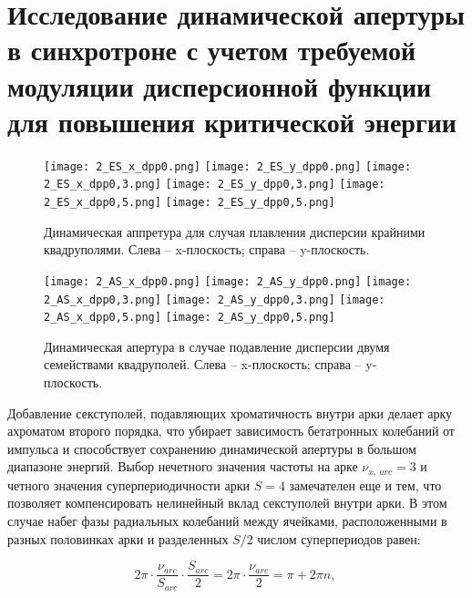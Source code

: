 \section{Исследование динамической апертуры в синхротроне с учетом требуемой модуляции дисперсионной функции для повышения критической энергии}

\begin{figure} [h!]
   \center
   \texttt{[image: 2\_ES\_x\_dpp0.png]}
   \texttt{[image: 2\_ES\_y\_dpp0.png]}
   \texttt{[image: 2\_ES\_x\_dpp0,3.png]}
   \texttt{[image: 2\_ES\_y\_dpp0,3.png]}
   \texttt{[image: 2\_ES\_x\_dpp0,5.png]}
   \texttt{[image: 2\_ES\_y\_dpp0,5.png]}
   \caption{Динамическая аппретура для случая плавления дисперсии крайними квадруполями. 
Слева – x-плоскость; справа – y-плоскость.}
   \label{fig:DA_ES_dpp}
\end{figure}	

\begin{figure} [h!]
   \center
   \texttt{[image: 2\_AS\_x\_dpp0.png]}
   \texttt{[image: 2\_AS\_y\_dpp0.png]}
   \texttt{[image: 2\_AS\_x\_dpp0,3.png]}
   \texttt{[image: 2\_AS\_y\_dpp0,3.png]}
   \texttt{[image: 2\_AS\_x\_dpp0,5.png]}
   \texttt{[image: 2\_AS\_y\_dpp0,5.png]}
   \caption{Динамическая апертура в случае подавление дисперсии двумя семействами квадруполей.
Слева – x-плоскость; справа – y-плоскость.}
   \label{fig:DA_AS_dpp}
\end{figure}

\par Добавление секступолей, подавляющих хроматичность внутри арки делает арку ахроматом второго порядка, что убирает зависимость бетатронных колебаний от импульса и способствует сохранению динамической апертуры в большом диапазоне энергий. Выбор нечетного значения частоты на арке $\nu_{x,\ arc}=3$ и четного значения суперпериодичности арки $S=4$ замечателен еще и тем, что позволяет компенсировать нелинейный вклад секступолей внутри арки. В этом случае набег фазы радиальных колебаний между ячейками, расположенными в разных половинках арки и разделенных $S/2$ числом суперпериодов равен:

\begin{equation}
2\pi\cdot\frac{\nu_{arc}}{S_{arc}}\cdot\frac{S_{arc}}{2}=2\pi\cdot\frac{\nu_{arc}}{2}=\pi+2\pi n,\
\label{eq:chrom_period}
\end{equation}

